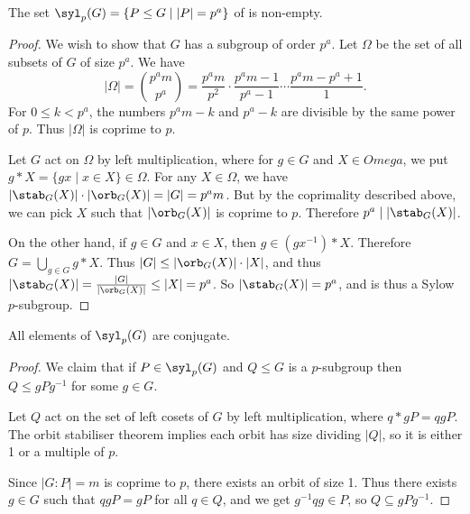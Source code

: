 \documentclass[a4paper]{scrartcl}
\begin{document}
\begin{theorem}
	The set $\syl_p(G) = \{P \leq G \mid |P| = p^a \}$ of  is non-empty.
\end{theorem}
\begin{proof}
	We wish to show that $G$ has a subgroup of order $p^a$.
	Let $\Omega$ be the set of all subsets of $G$ of size $p^a$.
	We have
	$$
	|\Omega| = \binom{p^a m}{p^a} = \frac{p^a m}{p^2} \cdot \frac{p^a m - 1}{p^a - 1} \cdots \frac{p^a m - p^a + 1}{1}.
	$$
	For $0 \leq k < p^a$, the numbers $p^am - k$ and $p^a  -k$ are divisible by the same power of $p$. Thus $|\Omega|$ is coprime to $p$.

	Let $G$ act on $\Omega$ by left multiplication, where for $g \in G
$ and $X \in Omega$, we put $g*X = \{gx \mid x \in X\} \in \Omega$. For any $X \in \Omega$, we have $|\stab_G(X)| \cdot |\orb_G(X)| = |G| = p^a m$. But by the coprimality described above, we can pick $X$ such that $|\orb_G(X)|$ is coprime to $p$. Therefore $p^a \mid |\stab_G(X)|$.

On the other hand, if $g \in G$ and $x \in X$, then $g \in (g x^{-1}) * X$. Therefore $G = \bigcup_{g \in G} g*X$. Thus $|G| \leq |\orb_G(X)| \cdot |X|$, and thus $|\stab_G(X)| = \frac{|G|}{|\orb_G(X)|} \leq |X| = p^a$. So $|\stab_G(X)| = p^a$, and is thus a Sylow $p$-subgroup.
\end{proof}

\begin{theorem}
	All elements of $\syl_p(G)$ are conjugate.
\end{theorem}
\begin{proof}
	We claim that if $P \in \syl_p(G)$ and $Q \leq G$ is a $p$-subgroup then $Q \leq gPg^{-1}$ for some $g \in G$.
	
	Let $Q$ act on the set of left cosets of $G$ by left multiplication, where $q * gP = qgP$. The orbit stabiliser theorem implies each orbit has size dividing $|Q|$, so it is either 1 or a multiple of $p$. 

	Since $|G:P| = m$ is coprime to $p$, there exists an orbit of size 1. Thus there exists $g \in G$ such that $qgP = gP$ for all $q \in Q$, and we get $g^{-1}q g \in P$, so $Q \subseteq gPg^{-1}$.
\end{proof}
\end{document}
